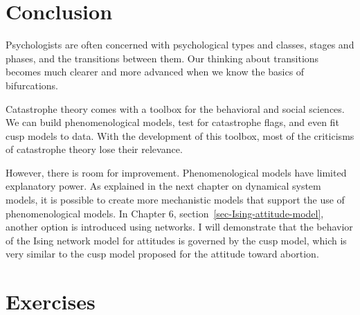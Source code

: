 \documentclass[
  a4paper,
  DIV=11,
  numbers=noendperiod,
  oneside]{scrreprt}
\begin{document}
\section{Conclusion}\label{sec-Conclusion-ch3}

Psychologists are often concerned with psychological types and classes,
stages and phases, and the transitions between them. Our thinking about
transitions becomes much clearer and more advanced when we know the
basics of bifurcations.

Catastrophe theory comes with a toolbox for the behavioral and social
sciences. We can build phenomenological models, test for catastrophe
flags, and even fit cusp models to data. With the development of this
toolbox, most of the criticisms of catastrophe theory lose their
relevance.

However, there is room for improvement. Phenomenological models have
limited explanatory power. As explained in the next chapter on dynamical
system models, it is possible to create more mechanistic models that
support the use of phenomenological models. In Chapter 6,
section~\ref{sec-Ising-attitude-model}, another option is introduced
using networks. I will demonstrate that the behavior of the Ising
network model for attitudes is governed by the cusp model, which is very
similar to the cusp model proposed for the attitude toward abortion.

\section{Exercises}\label{sec-Exercises-ch3}
\end{document}
